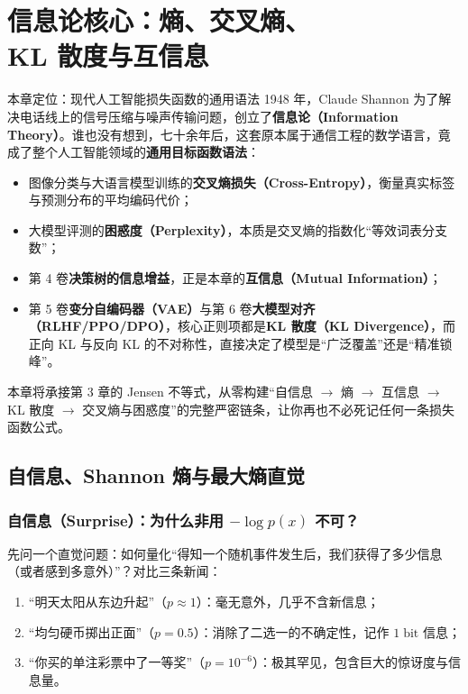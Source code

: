 \chapter[信息论：熵、交叉熵与 KL 散度]{信息论核心：熵、交叉熵、\\KL 散度与互信息}
\label{ch:ch4}


\begin{chapIntro}{本章定位：现代人工智能损失函数的通用语法}
1948 年，Claude Shannon 为了解决电话线上的信号压缩与噪声传输问题，创立了\textbf{信息论（Information Theory）}。谁也没有想到，七十余年后，这套原本属于通信工程的数学语言，竟成了整个人工智能领域的\textbf{通用目标函数语法}：
\begin{itemize}
  \item 图像分类与大语言模型训练的\textbf{交叉熵损失（Cross-Entropy）}，衡量真实标签与预测分布的平均编码代价；
  \item 大模型评测的\textbf{困惑度（Perplexity）}，本质是交叉熵的指数化“等效词表分支数”；
  \item 第 4 卷\textbf{决策树的信息增益}，正是本章的\textbf{互信息（Mutual Information）}；
  \item 第 5 卷\textbf{变分自编码器（VAE）}与第 6 卷\textbf{大模型对齐（RLHF/PPO/DPO）}，核心正则项都是\textbf{KL 散度（KL Divergence）}，而正向 KL 与反向 KL 的不对称性，直接决定了模型是“广泛覆盖”还是“精准锁峰”。
\end{itemize}
本章将承接第 3 章的 Jensen 不等式，从零构建“自信息 $\to$ 熵 $\to$ 互信息 $\to$ KL 散度 $\to$ 交叉熵与困惑度”的完整严密链条，让你再也不必死记任何一条损失函数公式。
\end{chapIntro}

\section{自信息、Shannon 熵与最大熵直觉}
\label{sec:ch4-entropy}

\subsection{自信息（Surprise）：为什么非用 $-\log p(x)$ 不可？}

先问一个直觉问题：如何量化“得知一个随机事件发生后，我们获得了多少信息（或者感到多意外）”？对比三条新闻：
\begin{enumerate}
  \item “明天太阳从东边升起”（$p \approx 1$）：毫无意外，几乎不含新信息；
  \item “均匀硬币掷出正面”（$p = 0.5$）：消除了二选一的不确定性，记作 $1\;\text{bit}$ 信息；
  \item “你买的单注彩票中了一等奖”（$p = 10^{-6}$）：极其罕见，包含巨大的惊讶度与信息量。
\end{enumerate}

